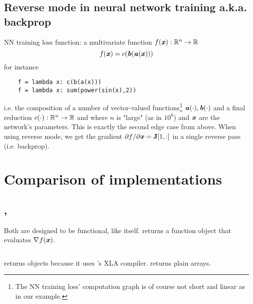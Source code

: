 \documentclass[paper=a4,11pt,headsepline]{scrartcl}
\newcommand{\ipmpy}[1]{\inputminted[xleftmargin=0.9cm]{python}{#1}}
\begin{document}
\subsection{Reverse mode in neural network training a.k.a. backprop}

NN training loss function: a multivariate function $f(\bm{\mathit{x}}): \mathbb R^n\rightarrow \mathbb R$
\begin{equation}
    f(\bm{\mathit{x}}) = c(\bm{\mathit{b}}(\bm{\mathit{a}}(\bm{\mathit{x}})))
\end{equation}
for instance
\begin{verbatim}
    f = lambda x: c(b(a(x)))
    f = lambda x: sum(power(sin(x),2))
\end{verbatim}
i.e. the composition of a number of vector-valued functions\footnote{ The NN
training loss' computation graph is of course not short and linear as in our
example.} $\bm{\mathit{a}}(\cdot), \bm{\mathit{b}}(\cdot)$ and a final reduction $c(\cdot): \mathbb
R^n\rightarrow \mathbb R$ and where $n$ is "large" (as in $10^6$) and $\bm{\mathit{x}}$ are the
network's parameters. This is exactly the second edge case from above. When
using reverse mode, we get the gradient $\partial f/\partial \bm{\mathit{x}} = \bm{\mathbf{J}}[1,:]$ in a
single reverse pass (i.e. backprop).

\section{Comparison of implementations}

\subsection{\jax, \autograd}

Both are designed to be functional, like \numpy itself.  returns a
function object that evaluates $\nabla f(\bm{\mathit{x}})$.
%
\ipmpy{../talk/code/jax_ad_teaser_grad_usage.py}
%
\jax returns  objects because it uses \tf's XLA compiler.
\autograd returns plain \numpy arrays.
\end{document}
